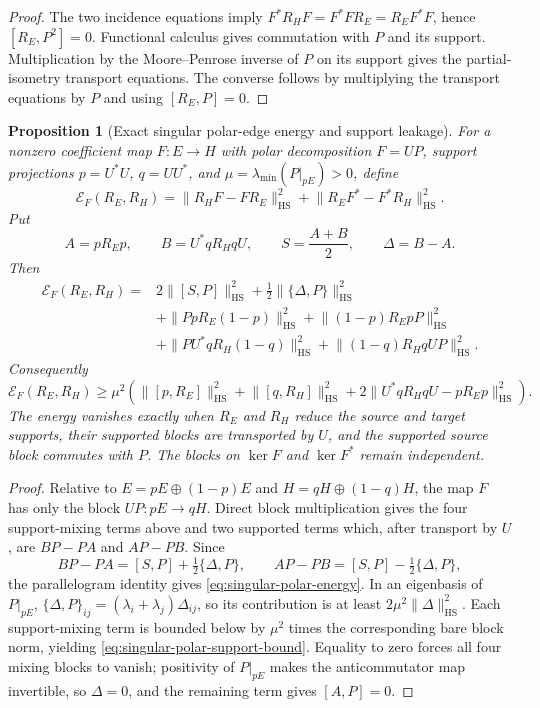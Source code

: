 \documentclass[11pt]{article}
\numberwithin{equation}{section}
\newtheorem{proposition}[theorem]{Proposition}
\theoremstyle{definition}
\theoremstyle{remark}
\newcommand{\HS}{\mathrm{HS}}
\newcommand{\norm}[1]{\lVert#1\rVert}
\begin{document}
\begin{proof}
The two incidence equations imply
$F^*R_HF=F^*FR_E=R_EF^*F$, hence $[R_E,P^2]=0$.
Functional calculus gives commutation with $P$ and its support.
Multiplication by the Moore--Penrose inverse of $P$ on its support gives the
partial-isometry transport equations.  The converse follows by multiplying
the transport equations by $P$ and using $[R_E,P]=0$.
\end{proof}

\begin{proposition}[Exact singular polar-edge energy and support leakage]
\label{prop:singular-polar-energy}
For a nonzero coefficient map $F:E\to H$ with polar decomposition
$F=UP$, support projections $p=U^*U$, $q=UU^*$, and
$\mu=\lambda_{\min}(P|_{pE})>0$, define
\[
\mathcal E_F(R_E,R_H)
=\norm{R_HF-FR_E}_{\HS}^2
 +\norm{R_EF^*-F^*R_H}_{\HS}^2.
\]
Put
\[
 A=pR_Ep,
 \qquad
 B=U^*qR_HqU,
 \qquad
 S=\frac{A+B}{2},
 \qquad
 \Delta=B-A.
\]
Then
\begin{align}
\mathcal E_F(R_E,R_H)={}&
2\norm{[S,P]}_{\HS}^2
+\frac12\norm{\{\Delta,P\}}_{\HS}^2
\nonumber\\
&+\norm{PpR_E(1-p)}_{\HS}^2
 +\norm{(1-p)R_EpP}_{\HS}^2
\nonumber\\
&+\norm{PU^*qR_H(1-q)}_{\HS}^2
 +\norm{(1-q)R_HqUP}_{\HS}^2.
\label{eq:singular-polar-energy}
\end{align}
Consequently
\begin{equation}
\mathcal E_F(R_E,R_H)
\ge
\mu^2\left(
\norm{[p,R_E]}_{\HS}^2
+\norm{[q,R_H]}_{\HS}^2
+2\norm{U^*qR_HqU-pR_Ep}_{\HS}^2
\right).
\label{eq:singular-polar-support-bound}
\end{equation}
The energy vanishes exactly when $R_E$ and $R_H$ reduce the source and target
supports, their supported blocks are transported by $U$, and the supported
source block commutes with $P$.  The blocks on $\ker F$ and $\ker F^*$ remain
independent.
\end{proposition}

\begin{proof}
Relative to $E=pE\oplus(1-p)E$ and $H=qH\oplus(1-q)H$, the map $F$ has
only the block $UP:pE\to qH$.  Direct block multiplication gives the four
support-mixing terms above and two supported terms which, after transport by
$U$, are $BP-PA$ and $AP-PB$.  Since
\[
BP-PA=[S,P]+\tfrac12\{\Delta,P\},
\qquad
AP-PB=[S,P]-\tfrac12\{\Delta,P\},
\]
the parallelogram identity gives \eqref{eq:singular-polar-energy}.  In an
eigenbasis of $P|_{pE}$,
$\{\Delta,P\}_{ij}=(\lambda_i+\lambda_j)\Delta_{ij}$, so its contribution is
at least $2\mu^2\norm{\Delta}_{\HS}^2$.  Each support-mixing term is bounded
below by $\mu^2$ times the corresponding bare block norm, yielding
\eqref{eq:singular-polar-support-bound}.  Equality to zero forces all four
mixing blocks to vanish; positivity of $P|_{pE}$ makes the anticommutator map
invertible, so $\Delta=0$, and the remaining term gives $[A,P]=0$.
\end{proof}
\end{document}
